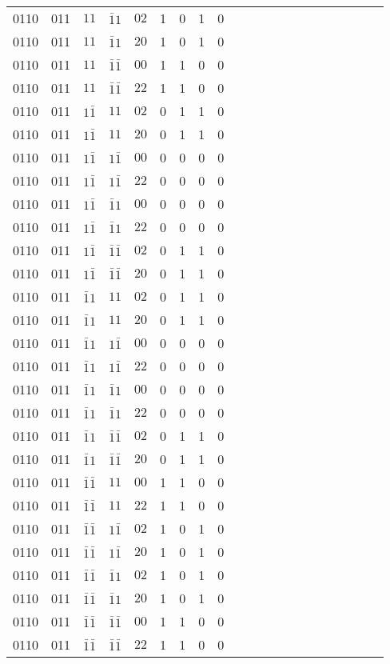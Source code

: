 \begin{longtable*}{c| cccccccccccccccccccc }
0110& 011& $11$& $\bar{1}1$& $02$& 1& 0& 1& 0\\
0110& 011& $11$& $\bar{1}1$& $20$& 1& 0& 1& 0\\
0110& 011& $11$& $\bar{1}\bar{1}$& $00$& 1& 1& 0& 0\\
0110& 011& $11$& $\bar{1}\bar{1}$& $22$& 1& 1& 0& 0\\
0110& 011& $1\bar{1}$& $11$& $02$& 0& 1& 1& 0\\
0110& 011& $1\bar{1}$& $11$& $20$& 0& 1& 1& 0\\
0110& 011& $1\bar{1}$& $1\bar{1}$& $00$& 0& 0& 0& 0\\
0110& 011& $1\bar{1}$& $1\bar{1}$& $22$& 0& 0& 0& 0\\
0110& 011& $1\bar{1}$& $\bar{1}1$& $00$& 0& 0& 0& 0\\
0110& 011& $1\bar{1}$& $\bar{1}1$& $22$& 0& 0& 0& 0\\
0110& 011& $1\bar{1}$& $\bar{1}\bar{1}$& $02$& 0& 1& 1& 0\\
0110& 011& $1\bar{1}$& $\bar{1}\bar{1}$& $20$& 0& 1& 1& 0\\
0110& 011& $\bar{1}1$& $11$& $02$& 0& 1& 1& 0\\
0110& 011& $\bar{1}1$& $11$& $20$& 0& 1& 1& 0\\
0110& 011& $\bar{1}1$& $1\bar{1}$& $00$& 0& 0& 0& 0\\
0110& 011& $\bar{1}1$& $1\bar{1}$& $22$& 0& 0& 0& 0\\
0110& 011& $\bar{1}1$& $\bar{1}1$& $00$& 0& 0& 0& 0\\
0110& 011& $\bar{1}1$& $\bar{1}1$& $22$& 0& 0& 0& 0\\
0110& 011& $\bar{1}1$& $\bar{1}\bar{1}$& $02$& 0& 1& 1& 0\\
0110& 011& $\bar{1}1$& $\bar{1}\bar{1}$& $20$& 0& 1& 1& 0\\
0110& 011& $\bar{1}\bar{1}$& $11$& $00$& 1& 1& 0& 0\\
0110& 011& $\bar{1}\bar{1}$& $11$& $22$& 1& 1& 0& 0\\
0110& 011& $\bar{1}\bar{1}$& $1\bar{1}$& $02$& 1& 0& 1& 0\\
0110& 011& $\bar{1}\bar{1}$& $1\bar{1}$& $20$& 1& 0& 1& 0\\
0110& 011& $\bar{1}\bar{1}$& $\bar{1}1$& $02$& 1& 0& 1& 0\\
0110& 011& $\bar{1}\bar{1}$& $\bar{1}1$& $20$& 1& 0& 1& 0\\
0110& 011& $\bar{1}\bar{1}$& $\bar{1}\bar{1}$& $00$& 1& 1& 0& 0\\
0110& 011& $\bar{1}\bar{1}$& $\bar{1}\bar{1}$& $22$& 1& 1& 0& 0\\

\end{longtable*}
